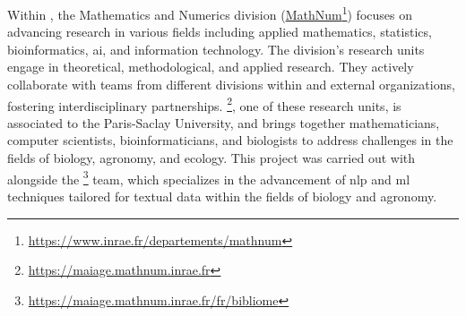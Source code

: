 Within \INRAE{}, the Mathematics and Numerics division (\href{https://www.inrae.fr/departements/mathnum}{MathNum}\footnote{\url{https://www.inrae.fr/departements/mathnum}}) focuses on advancing research in various fields including applied mathematics, statistics, bioinformatics, \gls{ai}, and information technology. The division's research units engage in theoretical, methodological, and applied research. They actively collaborate with teams from different divisions within \INRAE{} and external organizations, fostering interdisciplinary partnerships. \href{https://maiage.mathnum.inrae.fr}{\MAIAGE{}}\footnote{\url{https://maiage.mathnum.inrae.fr}}, one of these research units, is associated to the Paris-Saclay University, and brings together mathematicians, computer scientists, bioinformaticians, and biologists to address challenges in the fields of biology, agronomy, and ecology. This project was carried out with alongside the  \href{https://maiage.mathnum.inrae.fr/fr/bibliome}{\bibliome{}}\footnote{\url{https://maiage.mathnum.inrae.fr/fr/bibliome}} team, which specializes in the advancement of \gls{nlp} and \gls{ml} techniques tailored for textual data within the fields of biology and agronomy.  

